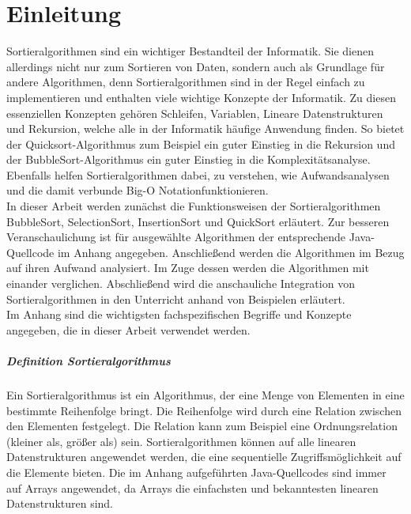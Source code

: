 \documentclass[./entry.tex]{subfiles}
\begin{document}
    \chapter{Einleitung}

    Sortieralgorithmen sind ein wichtiger Bestandteil der Informatik.
    Sie dienen allerdings nicht nur zum Sortieren von Daten,
    sondern auch als Grundlage für andere Algorithmen,
    denn Sortieralgorithmen sind in der Regel einfach zu implementieren
    und enthalten viele wichtige Konzepte der Informatik.
    Zu diesen essenziellen Konzepten gehören Schleifen,
    Variablen, Lineare Datenstrukturen und Rekursion, welche
    alle in der Informatik häufige Anwendung finden.
    So bietet der Quicksort-Algorithmus zum Beispiel ein guter Einstieg in die Rekursion
    und der BubbleSort-Algorithmus ein guter Einstieg in die Komplexitätsanalyse.
    Ebenfalls helfen Sortieralgorithmen dabei, zu verstehen,
    wie Aufwandsanalysen und die damit verbunde \dq Big-O Notation\dq funktionieren. \\


    In dieser Arbeit werden zunächst die Funktionsweisen der Sortieralgorithmen
    BubbleSort, SelectionSort, InsertionSort und QuickSort erläutert.
    Zur besseren Veranschaulichung ist für ausgewählte Algorithmen der entsprechende Java-Quellcode im Anhang angegeben.
    Anschließend werden die Algorithmen im Bezug auf ihren Aufwand analysiert.
    Im Zuge dessen werden die Algorithmen mit einander verglichen.
    Abschließend wird die anschauliche Integration von Sortieralgorithmen in den Unterricht
    anhand von Beispielen erläutert. \\

    Im Anhang sind die wichtigsten fachspezifischen Begriffe und Konzepte
    angegeben, die in dieser Arbeit verwendet werden. \\

    \paragraph{Definition Sortieralgorithmus}
    Ein Sortieralgorithmus ist ein Algorithmus, der eine Menge von Elementen in eine bestimmte Reihenfolge bringt.
    Die Reihenfolge wird durch eine Relation zwischen den Elementen festgelegt.
    Die Relation kann zum Beispiel eine Ordnungsrelation (kleiner als, größer als) sein.
    Sortieralgorithmen können auf alle linearen Datenstrukturen angewendet werden,
    die eine sequentielle Zugriffsmöglichkeit auf die Elemente bieten.
    Die im Anhang aufgeführten Java-Quellcodes sind immer auf Arrays angewendet,
    da Arrays die einfachsten und bekanntesten linearen Datenstrukturen sind.
\end{document}
